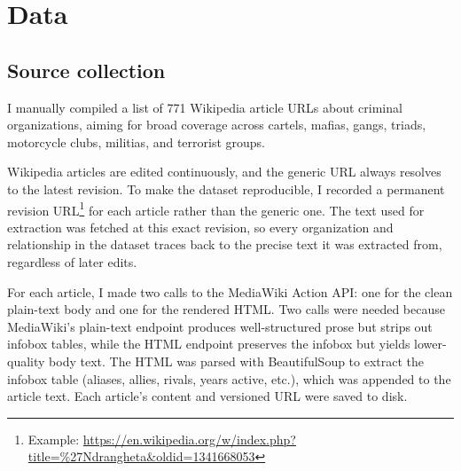 \documentclass[11pt,a4paper]{article}
\begin{document}
\section{Data}\label{sec:data}

\subsection{Source collection}
I manually compiled a list of 771 Wikipedia article URLs about criminal organizations, aiming for broad coverage across cartels, mafias, gangs, triads, motorcycle clubs, militias, and terrorist groups. 

Wikipedia articles are edited continuously, and the generic URL always resolves to the latest revision. To make the dataset reproducible, I recorded a permanent revision URL\footnote{Example: \url{https://en.wikipedia.org/w/index.php?title=\%27Ndrangheta&oldid=1341668053}} for each article rather than the generic one. The text used for extraction was fetched at this exact revision, so every organization and relationship in the dataset traces back to the precise text it was extracted from, regardless of later edits. 

For each article, I made two calls to the MediaWiki Action API: one for the clean plain-text body and one for the rendered HTML. Two calls were needed because MediaWiki's plain-text endpoint produces well-structured prose but strips out infobox tables, while the HTML endpoint preserves the infobox but yields lower-quality body text. The HTML was parsed with BeautifulSoup to extract the infobox table (aliases, allies, rivals, years active, etc.), which was appended to the article text. Each article's content and versioned URL were saved to disk.
\end{document}
